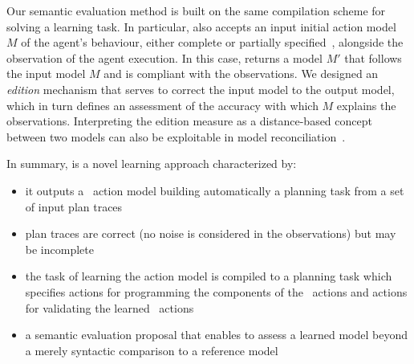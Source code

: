 Our semantic evaluation method is built on the same compilation scheme for solving a learning task. In particular, \FAMA also accepts an input initial action model $M$ of the agent's behaviour, either complete or partially specified~\cite{ZhuoNK13,ZhuoK17}, alongside the observation of the agent execution. In this case, \FAMA returns a model $M'$ that follows the input model $M$ and is compliant with the observations. We designed an {\em edition} mechanism that serves to correct the input model to the output model, which in turn defines an assessment of the accuracy with which $M$ explains the observations. Interpreting the edition measure as a distance-based concept between two models can also be exploitable in model reconciliation~\cite{KulkarniCZVZK16}.




\textcolor[rgb]{1.00,0.00,0.00}{In summary, \FAMA is a novel learning approach characterized by:
\begin{itemize}
\item it outputs a \strips\ action model building automatically a planning task from a set of input plan traces
\item plan traces are correct (no noise is considered in the observations) but may be incomplete
\item the task of learning the action model is compiled to a planning task which specifies actions for programming the components of the \strips\ actions and actions for validating the learned \strips\ actions
\item a semantic evaluation proposal that enables to assess a learned model beyond a merely syntactic comparison to a reference model
\end{itemize} }

